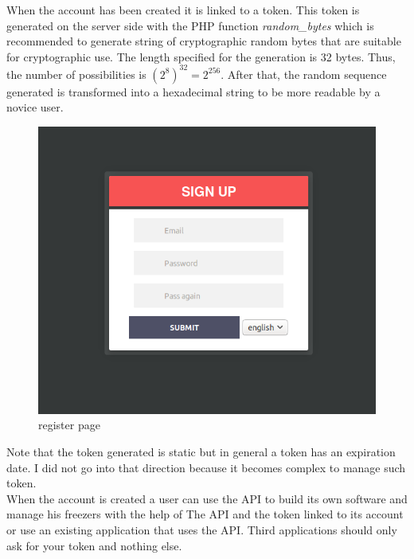 When the account has been created it is linked to a token. This token is generated on the server side with the PHP function \textit{random\_bytes} which is recommended to generate string of cryptographic random bytes that are suitable for cryptographic use. The length  specified for the generation is 32 bytes. Thus, the number of possibilities is $(2^8)^{32} = 2^{256}$. After that, the random sequence generated is transformed into a hexadecimal string to be more readable by a novice user.\\
\begin{figure}[H]
\centering
\includegraphics[scale=0.3]{./images/register.png}
\caption{register page}
\label{fig:register}
\end{figure}

Note that the token generated is static but in general a token has an expiration date. I did not go into that direction because it becomes complex to manage such token. \\

When the account is created a user can use the API to build its own software and manage his freezers with the help of The API and the token linked to its account or use an existing application that uses the API. Third applications should only ask for your token and nothing else.\\

